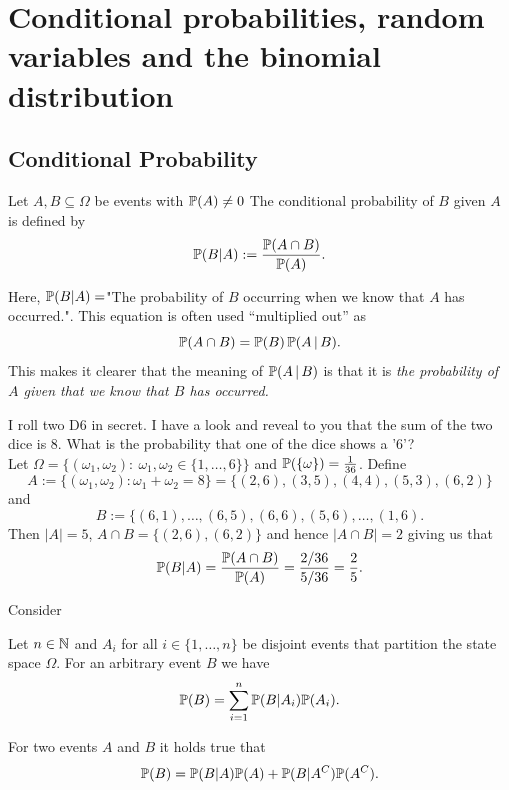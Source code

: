 \section{Conditional probabilities, random variables and the binomial distribution}

\subsection{Conditional Probability}
\begin{defn}
Let $A, B \subseteq \Omega$ be events with ${\mathbb P}(A) \not=0$ The conditional probability of $B$ given $A$ is defined by
\[{\mathbb P}(B \vert A) := \frac{{\mathbb P}(A \cap B)}{{\mathbb P}(A)}.\]
\end{defn}
\noindent Here, ${\mathbb P}( B \vert A)=$"The probability of $B$ occurring when we know that $A$ has occurred.". This equation is often used ``multiplied out'' as
\[{\mathbb P}(A \cap B) = {\mathbb P}(B) \, {\mathbb P}(A \, | \, B). \]
This makes it clearer that the meaning of ${\mathbb P}(A \, | \, B)$ is that it is \emph{the probability of $A$ given that we know that $B$ has occurred.}
\begin{example}
I roll two D6 in secret. I have a look and reveal to you that the sum of the two dice is $8$. What is the probability that one of the dice shows a '$6$'?\\ \linebreak
Let $\Omega = \{ (\omega_1,\omega_2):\ \omega_1,\omega_2 \in \{1, \ldots, 6 \}\}$ and ${\mathbb P}(\{\omega\}) = \frac{1}{36}$. Define 
\[A:=\{ (\omega_1,\omega_2): \omega_1+ \omega_2 = 8 \} = \{ (2,6),(3,5), (4,4), (5,3), (6,2)\}\]
and 
\[B:=\{ (6,1),\ldots,(6,5),(6,6),(5,6),\ldots,(1,6).\]
\linebreak\noindent Then $\vert A \vert =5$, $A \cap B= \{ (2,6),(6,2)\}$ and hence $\vert A \cap B \vert = 2$ giving us that
\[ {\mathbb P}(B \vert A) = \frac{{\mathbb P}(A \cap B)}{{\mathbb P}(A)} = \frac{ 2/36}{5/36} = \frac25.\]
\end{example}
Consider
\begin{prop}
Let $n\in {\mathbb N}$ and $A_i$ for all $i \in \{1,\ldots,n\}$ be disjoint events that partition the state space $\Omega$. For an arbitrary event $B$ we have
\begin{align*}
{\mathbb P}(B)
= \sum_{i=1}^n {\mathbb P}(B \vert A_i ) {\mathbb P}(A_i).
\end{align*}
\end{prop}
\begin{corr}
For two events $A$ and $B$ it holds true that
\begin{align*}
{\mathbb P}(B) = {\mathbb P}(B \vert A) {\mathbb P}(A) + {\mathbb P}(B \vert A^C) {\mathbb P}(A^C)
.
\end{align*}
\end{corr}
